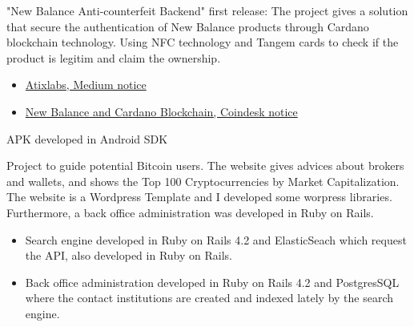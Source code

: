 \documentclass[9pt,a4paper]{altacv}
\begin{document}


"New Balance Anti-counterfeit Backend" first release:
The project gives a solution that secure the authentication of New Balance products through Cardano blockchain technology. Using NFC technology and Tangem cards to check if the product is legitim and claim the ownership. 

\begin{itemize}
\item  \href{https://medium.com/atix-labs/atix-and-cardano-team-up-with-new-balance-against-fraud-f56e62632225}{Atixlabs, Medium notice}
\item \href{https://www.coindesk.com/cardano-and-new-balance-will-team-up-to-stop-counterfeit-kicks}{New Balance and Cardano Blockchain, Coindesk notice}
\end{itemize}

\divider

APK developed in Android SDK
\divider


Project to guide potential Bitcoin users. The website gives advices about brokers and wallets, and shows the Top 100 Cryptocurrencies by Market Capitalization.
The website is a Wordpress Template and I developed some worpress libraries. Furthermore, a back office administration was developed in Ruby on Rails.

\divider


\divider

\begin{itemize}
    \item Search engine developed in Ruby on Rails 4.2 and ElasticSeach which request the API, also developed in Ruby on Rails.
    \item Back office administration developed in Ruby on Rails 4.2 and PostgresSQL where the contact institutions are created and indexed lately by the search engine.
\end{itemize}
\end{document}
